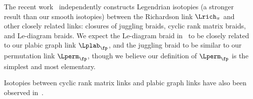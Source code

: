 %
%
%

%

%


\begin{remark}
The recent work~\cite{CGGS} independently constructs Legendrian isotopies (a stronger result than our smooth isotopies) between the Richardson link $\Lrich_\pi$ and other closely related links: closures of juggling braids, cyclic rank matrix braids, and Le-diagram braids.  We expect the Le-diagram braid in~\cite{CGGS} to be closely related to our plabic graph link $\Lplab_\fp$, and the juggling braid to be similar to our permutation link $\Lperm_\fp$, though we believe our definition of $\Lperm_\fp$ is the simplest and most elementary.

Isotopies between cyclic rank matrix links and plabic graph links have also been observed in~\cite{STWZ}.
%
%
\end{remark}

